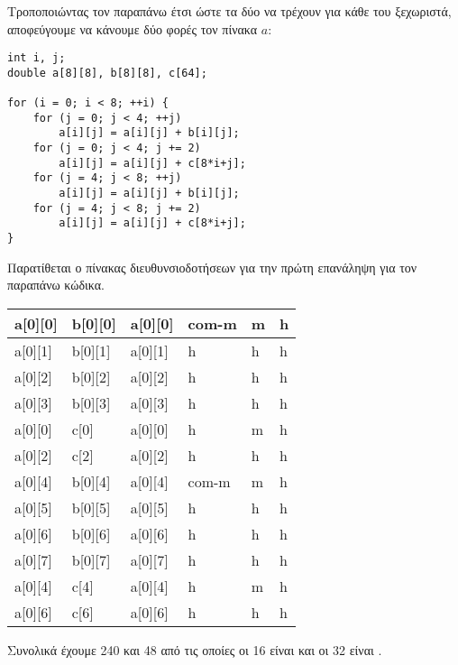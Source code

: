 \documentclass[10pt]{assignment}
\begin{document}
\newpage

Τροποποιώντας τον παραπάνω έτσι ώστε τα δύο  να τρέχουν για κάθε  του  ξεχωριστά, αποφεύγουμε να κάνουμε δύο φορές  τον πίνακα $a$:

\begin{center}
\begin{verbatim}
int i, j;
double a[8][8], b[8][8], c[64];

for (i = 0; i < 8; ++i) {
    for (j = 0; j < 4; ++j) 
        a[i][j] = a[i][j] + b[i][j];
    for (j = 0; j < 4; j += 2) 
        a[i][j] = a[i][j] + c[8*i+j];
    for (j = 4; j < 8; ++j)
        a[i][j] = a[i][j] + b[i][j];
    for (j = 4; j < 8; j += 2)
        a[i][j] = a[i][j] + c[8*i+j];
}
\end{verbatim}
\end{center}

Παρατίθεται ο πίνακας διευθυνσιοδοτήσεων για την πρώτη επανάληψη για τον παραπάνω κώδικα.

\begin{center}
\begin{tabularx}{\textwidth}{|Y|Y|Y|Y|Y|Y|}
\hline
a[0][0] & b[0][0] & a[0][0] & com-m & m & h \\ 
\hline
a[0][1] & b[0][1] & a[0][1] & h & h & h \\ 
\hline
a[0][2] & b[0][2] & a[0][2] & h & h & h \\ 
\hline
a[0][3] & b[0][3] & a[0][3] & h & h & h \\ 
\hline
a[0][0] & c[0]    & a[0][0] & h & m & h \\ 
\hline
a[0][2] & c[2]    & a[0][2] & h & h & h \\ 
\hline
a[0][4] & b[0][4] & a[0][4] & com-m & m & h \\ 
\hline
a[0][5] & b[0][5] & a[0][5] & h & h & h \\ 
\hline
a[0][6] & b[0][6] & a[0][6] & h & h & h \\ 
\hline
a[0][7] & b[0][7] & a[0][7] & h & h & h \\ 
\hline
a[0][4] & c[4]    & a[0][4] & h & m & h \\ 
\hline
a[0][6] & c[6]    & a[0][6] & h & h & h \\
\hline
\end{tabularx}
\end{center}
\vspace{4pt}
Συνολικά έχουμε 240  και 48  από τις οποίες οι 16 είναι  και οι 32 είναι . 
\end{document}
